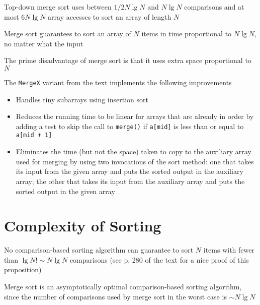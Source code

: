 \documentclass[8pt,a4paper,compress]{beamer}
\begin{document}
\begin{frame}[fragile]
\pause

Top-down merge sort uses between $1/2N\lg N$ and $N\lg N$ comparisons and at most $6N\lg N$ array accesses to sort an array of length $N$

\pause
\bigskip

Merge sort guarantees to sort an array of $N$ items in time proportional to $N \lg N$, no matter what the input

\pause
\bigskip

The prime disadvantage of merge sort is that it uses extra space proportional to $N$

\pause
\bigskip

The \lstinline{MergeX} variant from the text implements the following improvements

\begin{itemize}
\item Handles tiny subarrays using insertion sort
\item Reduces the running time to be linear for arrays that are already in order by adding a test to skip the call to \lstinline$merge()$ if \lstinline$a[mid]$ is less than or equal to \lstinline$a[mid + 1]$
\item Eliminates the time (but not the space) taken to copy to the auxiliary array used for merging by using two invocations of the sort method: one that takes its input from the given array and puts the sorted output in the auxiliary array; the other that takes its input from the auxiliary array and puts the sorted output in the given array
\end{itemize}
\end{frame}

\section{Complexity of Sorting}
\begin{frame}[fragile]
\pause

No comparison-based sorting algorithm can guarantee to sort $N$ items with fewer than $\lg N! \sim N\lg N$ comparisons (see p. 280 of the text for a nice proof of this proposition)

\pause
\bigskip

Merge sort is an asymptotically optimal comparison-based sorting algorithm, since the number of comparisons used by merge sort in the worst case is $\sim N\lg N$
\end{frame}
\end{document}
